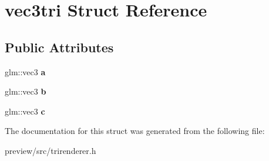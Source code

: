 \hypertarget{structvec3tri}{}\section{vec3tri Struct Reference}
\label{structvec3tri}
\subsection*{Public Attributes}
\begin{DoxyCompactItemize}
\item 
\hypertarget{structvec3tri_abbce1765e745050a6e708bb848b28492}{}glm\+::vec3 {\bfseries a}\label{structvec3tri_abbce1765e745050a6e708bb848b28492}

\item 
\hypertarget{structvec3tri_a3c1a84a5f66c500026552c13a4d2b7f3}{}glm\+::vec3 {\bfseries b}\label{structvec3tri_a3c1a84a5f66c500026552c13a4d2b7f3}

\item 
\hypertarget{structvec3tri_a9307252444ab03989eca2857c4f29c73}{}glm\+::vec3 {\bfseries c}\label{structvec3tri_a9307252444ab03989eca2857c4f29c73}

\end{DoxyCompactItemize}


The documentation for this struct was generated from the following file\+:\begin{DoxyCompactItemize}
\item 
preview/src/trirenderer.\+h\end{DoxyCompactItemize}
